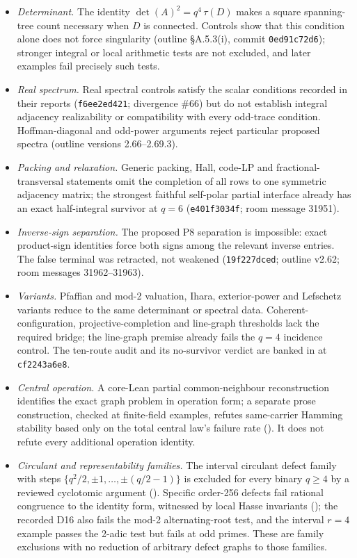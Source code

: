 \documentclass{anvil-paper}
\theoremstyle{definition}
\begin{document}
\begin{itemize}
\item \emph{Determinant.} The identity $\det(A)^2=q^4\,\tau(D)$ makes a square spanning-tree count necessary when $D$ is connected. Controls show that this condition alone does not force singularity (outline \S A.5.3(i), commit \texttt{0ed91c72d6}); stronger integral or local arithmetic tests are not excluded, and later examples fail precisely such tests.
\item \emph{Real spectrum.} Real spectral controls satisfy the scalar conditions recorded in their reports (\texttt{f6ee2ed421}; divergence \#66) but do not establish integral adjacency realizability or compatibility with every odd-trace condition. Hoffman-diagonal and odd-power arguments reject particular proposed spectra (outline versions 2.66--2.69.3).
\item \emph{Packing and relaxation.} Generic packing, Hall, code-LP and fractional-transversal statements omit the completion of all rows to one symmetric adjacency matrix; the strongest faithful self-polar partial interface already has an exact half-integral survivor at $q=6$ (\texttt{e401f3034f}; room message 31951).
\item \emph{Inverse-sign separation.} The proposed P8 separation is impossible: exact product-sign identities force both signs among the relevant inverse entries. The false terminal was retracted, not weakened (\texttt{19f227dced}; outline v2.62; room messages 31962--31963).
\item \emph{Variants.} Pfaffian and mod-2 valuation, Ihara, exterior-power and Lefschetz variants reduce to the same determinant or spectral data. Coherent-configuration, projective-completion and line-graph thresholds lack the required bridge; the line-graph premise already fails the $q=4$ incidence control. The ten-route audit and its no-survivor verdict are banked in  at \texttt{cf2243a6e8}.
\item \emph{Central operation.} A core-Lean partial common-neighbour reconstruction identifies the exact graph problem in operation form; a separate prose construction, checked at finite-field examples, refutes same-carrier Hamming stability based only on the total central law's failure rate (). It does not refute every additional operation identity.
\item \emph{Circulant and representability families.} The interval circulant defect family with steps $\{q^2/2,\pm 1,\dots,\pm(q/2-1)\}$ is excluded for every binary $q\ge 4$ by a reviewed cyclotomic argument (). Specific order-256 defects fail rational congruence to the identity form, witnessed by local Hasse invariants (); the recorded D16 also fails the mod-2 alternating-root test, and the interval $r=4$ example passes the 2-adic test but fails at odd primes. These are family exclusions with no reduction of arbitrary defect graphs to those families.

\end{itemize}
\end{document}
